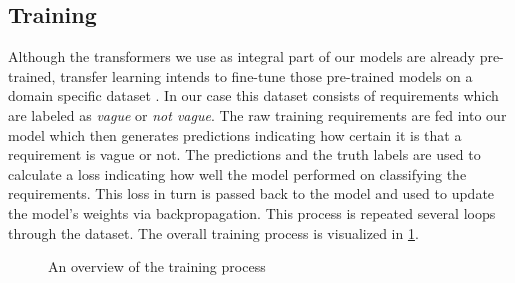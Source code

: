 \subsection{Training}
\label{chp:study:sec:design:subsec:training}
Although the transformers we use as integral part of our models are already pre-trained, transfer learning intends to fine-tune those pre-trained models on a domain specific dataset \parencite{Pan:2010}.
In our case this dataset consists of requirements which are labeled as \textit{vague} or \textit{not vague}.
The raw training requirements are fed into our model which then generates predictions indicating how certain it is that a requirement is vague or not.
The predictions and the truth labels are used to calculate a loss indicating how well the model performed on classifying the requirements.
This loss in turn is passed back to the model and used to update the model's weights via backpropagation.
This process is repeated several loops through the dataset.
The overall training process is visualized in \cref{fig:study:design:training}.

\begin{figure}[htpb]
    \centering
    \def\svgwidth{\columnwidth}
    
    \caption[Study Design: Training]{An overview of the training process}\label{fig:study:design:training}
\end{figure}

